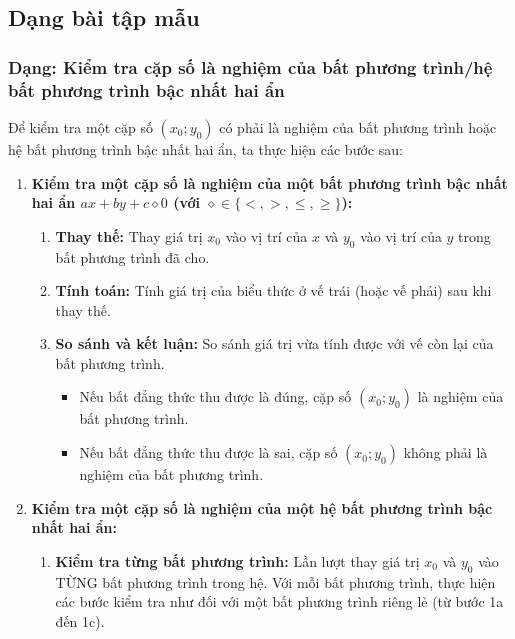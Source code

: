 

\subsection{Dạng bài tập mẫu}

\subsubsection{Dạng: Kiểm tra cặp số là nghiệm của bất phương trình/hệ bất phương trình bậc nhất hai ẩn}
\begin{phuongphap}
Để kiểm tra một cặp số $(x_0; y_0)$ có phải là nghiệm của bất phương trình hoặc hệ bất phương trình bậc nhất hai ẩn, ta thực hiện các bước sau:
\begin{enumerate}
    \item \textbf{Kiểm tra một cặp số là nghiệm của một bất phương trình bậc nhất hai ẩn $ax + by + c \diamond 0$ (với $\diamond \in \{<, >, \le, \ge\}$):}
    \begin{enumerate}
        \item \textbf{Thay thế:} Thay giá trị $x_0$ vào vị trí của $x$ và $y_0$ vào vị trí của $y$ trong bất phương trình đã cho.
        \item \textbf{Tính toán:} Tính giá trị của biểu thức ở vế trái (hoặc vế phải) sau khi thay thế.
        \item \textbf{So sánh và kết luận:} So sánh giá trị vừa tính được với vế còn lại của bất phương trình.
        \begin{itemize}
            \item Nếu bất đẳng thức thu được là đúng, cặp số $(x_0; y_0)$ là nghiệm của bất phương trình.
            \item Nếu bất đẳng thức thu được là sai, cặp số $(x_0; y_0)$ không phải là nghiệm của bất phương trình.
        \end{itemize}
    \end{enumerate}
    \item \textbf{Kiểm tra một cặp số là nghiệm của một hệ bất phương trình bậc nhất hai ẩn:}
    \begin{enumerate}
        \item \textbf{Kiểm tra từng bất phương trình:} Lần lượt thay giá trị $x_0$ và $y_0$ vào TỪNG bất phương trình trong hệ. Với mỗi bất phương trình, thực hiện các bước kiểm tra như đối với một bất phương trình riêng lẻ (từ bước 1a đến 1c).

\end{enumerate}
\end{enumerate}
\end{phuongphap}

